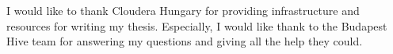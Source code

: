 \chapter*{\koszonetnyilvanitas}

I would like to thank Cloudera Hungary for providing infrastructure and resources for writing my thesis. Especially, I would like thank to the Budapest Hive team for answering my questions and giving all the help they could.